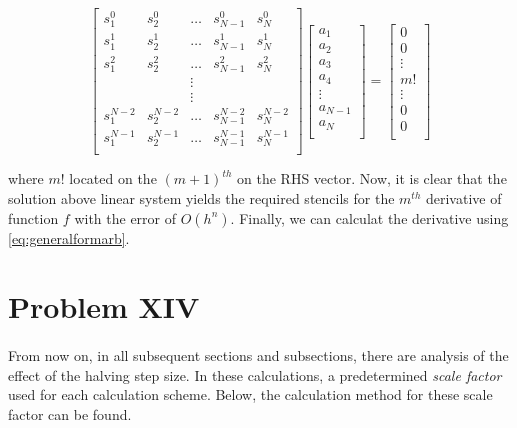 \documentclass[letterpaper,12pt]{article}
\begin{document}
\begin{equation*}
    \begin{bmatrix}
        s_1^0 & s_2^0 & \dots & s_{N-1}^0 & s_N^0\\
        s_1^1 & s_2^1 & \dots & s_{N-1}^1 & s_N^1\\
        s_1^2 & s_2^2 & \dots & s_{N-1}^2 & s_N^2\\
        & & \vdots & & \\   
        & & \vdots & & \\   
        s_1^{N-2} & s_2^{N-2} & \dots & s_{N-1}^{N-2} & s_N^{N-2}\\
        s_1^{N-1} & s_2^{N-1} & \dots & s_{N-1}^{N-1} & s_N^{N-1}\\
    \end{bmatrix}
    \begin{bmatrix}
        a_{1} \\
        a_{2} \\
        a_{3} \\
        a_{4} \\
        \vdots \\
        a_{N-1} \\
        a_{N} \\
    \end{bmatrix} =
    \begin{bmatrix}
        0 \\
        0 \\
        \vdots \\
        m! \\
        \vdots \\
        0 \\
        0\\
    \end{bmatrix}
\end{equation*}

where $m!$ located on the $(m+1)^{th}$ on the RHS vector. Now, it is clear that the solution above linear system yields the required stencils for the $m^{th}$ derivative of function $f$ with the error of $O(h^n)$. Finally, we can calculat the derivative using \eqref{eq:generalformarb}.

\section{Problem XIV}
\paragraph{} From now on, in all subsequent sections and subsections, there are analysis of the effect of the halving step size. In these calculations, a predetermined \textit{scale factor} used for each calculation scheme. Below, the calculation method for these scale factor can be found.
\end{document}
